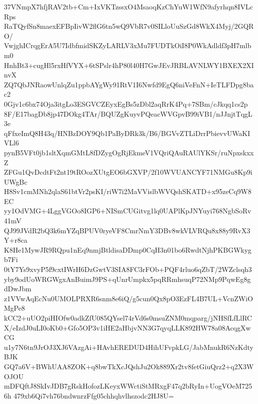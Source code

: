 37VNmpX7hfjRAV2tb+Cm+IxVKTzssxO4MsaoqKzChYuW1WfN9afyrhqn8IVLcRps
RaTQyfSn8maexEFBpIivW2flG6tn5wQ9VbR7v0SILloUuSzGd8WkX4Myj/2GQRO/
VwjghICrqgErA5U7IdbfmidSKZyLARLV3xMu7FUDTkOiI8P0WkAdldf3pH7mlbm0
HnhBt3+cugHl5rxHfVYX+6tSPslr4hP80l40H7GwJEvJRBLAVNLWY1BXEX2XInvX
ZQ7QbJNRaowUnlqZu1ppbAYgWy91RtV1I6Nwfd9EgQ6niVeFnN+IeTLFDpg8bac2
0Gjv1c6bx74Oja3itgLo3ESGVCZEyxEgBs5zDbl2aqRrK4Pq+7SBm/cJkqq1cs2p
8F/E17bagDb8jp47DOkg4TAr/BQUZgKuyvPQeacWVGpvB99iVB1/nJJnjtTqgL3e
qFfxeImQ8H43q/HNBzDOY9Qb1PaByDRk3k/B6/BGVvZTLiDrrPbievvUWaKIVLl6
pynB5VFt0jb1sltXqmGMtL8fDZygOgRjEkmeV1VQriQAuRAUlYKSr/ruNpxskxxZ
ZFGu1QvDcdtFt2nt19tROozXUtgEO6bGXVP/2f10WVUANCYF71NMGu8Kp9iUWgBc
H8Sv1cmMNh2qlaS61btVr2psKI/riW7i2MaVVislbWVQshSKATD+x95zeCq9W8EC
yy1OdVMG+4LggVGOo8IGP6+NISmCUGitvg1lq0UAPlKpJNYuyi768NgbSoRv41mV
QJ99JVdR2bQ3k6mYZqBPUV0ryeVF8CmrNmY3DBv8wkVLVRQu8x88y9RvX3Y+r8ca
K8He1MywJR9RQpu1nEq9nmjBtldisaDDmp0CqH3n01bo6RwdtNjhPKBGWkygb7Fi
0tY7Ys9xvyP5f9cxtIWrH6DzGwtV3SIA8FC3rFOb+PQF4rluo6qZbT/2WZclsqh3
yby9odUoWRGWgxAnBuimJ9PS+qUnrUmpkx5pqRRmhsuqP72NMp9PqwEg8gdDwJbm
z1VVwAqEcNu0UMOLPRXR6snm8e6iQ/g5cun0Qx8pO3EzFL4B7UL+VcnZWiOMgPe8
kCC2+uUO2piHIOfw0adkZfU085QYsel74rVd6s0msuZNM0mqparg/jNHSfLfLlRC
X/eIzdJ0uLI0oKb0+Gfo5OP3v1iHE2aHbjvNN3G7qyqLLK892HW78a08AcqgXwCG
u1y7N6tn9JrOJ3XJ6VAzgAi+HAvhEREDUD4HihUFvpkLG/JabMnukR6NzKdtyBJK
GQ7a6V+BWhUAA8ZOK+q8bwTkXcJQshJu2Ok889Xr2tv8fetGiuQrz2+q2X3WOJOU
mDFQftJ8SkIvJDB7gRskHofozLKeyxWWctiStMRxgF47q2bRyIn+UogVOeM7256h
479xb6Qi7vh76bndwnrzFfg05chhqhvlhszodc2HJ8U=
